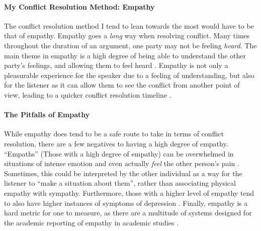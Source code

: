 \documentclass[stu,12pt]{apa7}
\begin{document}
      \paragraph{My Conflict Resolution Method: Empathy}
        The conflict resolution method I tend to lean towards the most would
          have to be that of empathy. Empathy goes a \textit{long} way when
          resolving conflict. Many times throughout the duration of an argument,
          one party may not be feeling \emph{heard}. The main theme in empathy
          is a high degree of being able to understand the other party's
          feelings, and allowing them to feel heard
          \parencite[pp. 48]{wied_empathy_2007}. Empathy is not only a
          pleasurable experience for the speaker due to a feeling of
          understanding, but also for the listener as it can allow them to see
          the conflict from another point of view, leading to a quicker conflict
          resolution timeline \parencite[pp. 49]{wied_empathy_2007}.

      \paragraph{The Pitfalls of Empathy}
        While empathy does tend to be a safe route to take in terms of conflict
          resolution, there are a few negatives to having a high degree of
          empathy. ``Empaths'' (Those with a high degree of empathy) can be
          overwhelmed in situations of intense emotion and even actually
          \textit{feel} the other person's pain
          \parencite[pp. 376]{schieman_when_2001}. Sometimes, this could be
          interpreted by the other individual as a way for the listener to
          ``make a situation about them'', rather than associating physical
          empathy with sympathy. Furthermore, those with a higher level of
          empathy tend to also have higher instances of symptoms of depression
          \parencite[pp. 376]{schieman_when_2001}. Finally, empathy is a hard
          metric for one to measure, as there are a multitude of systems
          designed for the academic reporting of empathy in academic studies
          \parencite[pp. 675]{zaki_neuroscience_2012}.



  \newpage
  \printbibliography[%
    title={References},%
    heading={bibintoc},%
    notcategory={consulted}%
  ]

  \newpage
  \nocite{*}
  \printbibliography[%
    title={Additional References},%
    heading={bibintoc},%
    category={consulted}%
  ]
\end{document}
